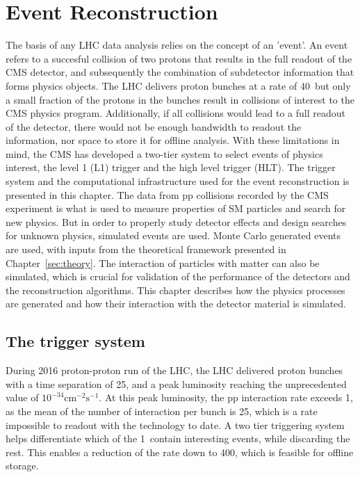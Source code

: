 \chapter{Event Reconstruction}
\noindent\justify
The basis of any LHC data analysis relies on the concept of an 'event'. 
An event refers to a succesful collision of two protons that results in the full readout of the CMS detector, and subsequently the combination of subdetector information that forms physics objects. 
The LHC delivers proton bunches at a rate of 40\MHz\ but only a small fraction of the protons in the bunches result in collisions of interest to the CMS physics program.
Additionally, if all collisions would lead to a full readout of the detector, there would not be enough bandwidth to readout the information, nor space to store it for offline analysis. 
With these limitations in mind, the CMS has developed a two-tier system to select events of physics interest, the level 1 (L1) trigger and the high level trigger (HLT). 
\newpara
\noindent\justify
The trigger system and the computational infrastructure used for the event reconstruction is presented in this chapter. 
The data from pp collisions recorded by the CMS experiment is what is used to measure properties of SM particles and search for new physics. 
But in order to properly study detector effects and design searches for unknown physics, simulated events are used.  
Monte Carlo generated events are used, with inputs from the theoretical framework presented in Chapter~\ref{sec:theory}.
The interaction of particles with matter can also be simulated, which is crucial for validation of the performance of the detectors and the reconstruction algorithms.
This chapter describes how the physics processes are generated and how their interaction with the detector material is simulated.                                               
\newpage
\section{The trigger system}\label{trigger}
\noindent
\justify
During 2016 proton-proton run of the LHC, the LHC delivered proton bunches with a time separation of 25\ns, and a peak luminosity reaching the unprecedented value of $10^{-34}\mathrm{cm}^{-2}\mathrm{s}^{-1}$. 
At this peak luminosity, the pp interaction rate exceeds 1\GHz, as the mean of the number of interaction per bunch is 25, which is a rate impossible to readout with the technology to date.   
A two tier triggering system helps differentiate which of the 1\GHz\ contain interesting events, while discarding the rest. 
This enables a reduction of the rate down to 400\Hz, which is feasible for offline storage.   
